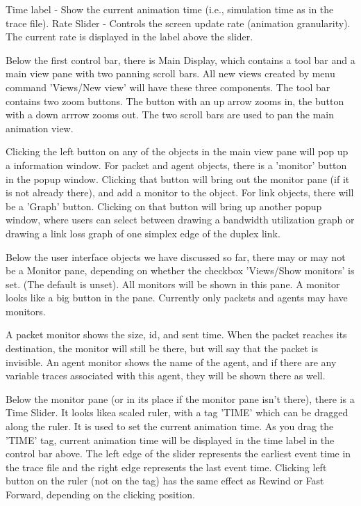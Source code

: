 Time label - Show the current animation time (i.e., simulation time as in the trace file). 
Rate Slider - Controls the screen update rate (animation granularity). The current rate is displayed in the label above the slider.


Below the first control bar, there is Main Display, which contains a tool bar and a main view pane with two panning scroll bars. All new views created by menu command  'Views/New view' will have these three components. The  tool bar contains two zoom buttons. The  button with an up arrow zooms in, the button with a down arrrow zooms out. The two scroll bars are used to pan the main animation view. 

Clicking the left button on any of the objects in the main view pane will pop up a information window. For packet and agent objects, there is a 'monitor' button in the popup window. Clicking that  button  will  bring  out  the  monitor  pane (if  it  is  not already there),  and add a monitor to the object.  For link objects, there will be a 'Graph' button. Clicking on that button will bring up another popup window, where users can select between drawing a bandwidth  utilization graph or drawing a link loss graph of one simplex edge of the duplex link.

Below the user interface objects we have discussed  so  far, there  may  or  may  not  be  a Monitor  pane, depending  on whether the checkbox 'Views/Show monitors' is set. (The default is unset). All monitors will be shown in this pane. A monitor looks like a big button in the pane. Currently only packets and agents may have monitors.

 A packet monitor shows the size, id, and sent time. When the packet reaches its destination, the monitor will still be there, but will say that the packet is invisible. An agent monitor shows the name of the agent, and if there are any variable traces associated with this agent, they will be shown there as well.
 
Below the monitor pane (or in its place if the monitor pane isn't there), there is a Time Slider. It looks likea scaled ruler, with a tag 'TIME' which can be dragged along the ruler. It is used to set the current animation time.  As you drag the 'TIME' tag, current animation time will be displayed in the time label in the control bar above. The left edge of the slider represents the earliest event time in the trace file and the right edge represents the last event time. Clicking left button on the ruler (not on the tag) has the same effect as Rewind or Fast Forward, depending on the clicking position.


